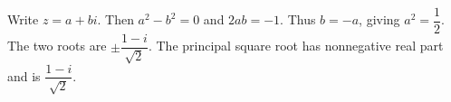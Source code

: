 Write $z=a+bi$. Then $a^2-b^2=0$ and $2ab=-1$. Thus $b=-a$, giving $a^2=\dfrac{1}{2}$. The two roots are $\boxed{\pm\dfrac{1-i}{\sqrt2}}$. The principal square root has nonnegative real part and is $\boxed{\dfrac{1-i}{\sqrt2}}$.
